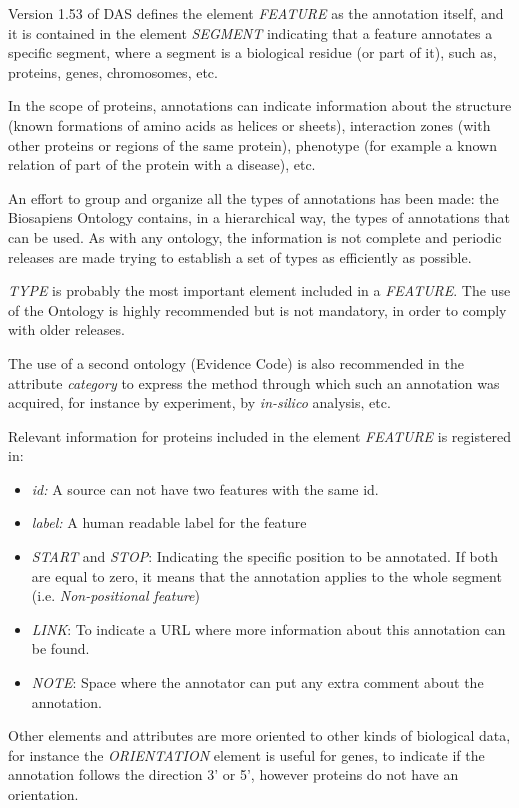 Version 1.53 of DAS defines the element \emph{FEATURE} as the annotation itself, and it is contained in the element \emph{SEGMENT} indicating that a feature annotates a specific segment, where a segment is a biological residue (or part of it), such as, proteins, genes, chromosomes, etc.

In the scope of proteins, annotations can indicate information about the structure (known formations of amino acids as helices or sheets), interaction zones (with other proteins or regions of the same protein), phenotype (for example a known relation of part of the protein with a disease), etc. 

An effort to group and organize all the types of annotations has been made: the Biosapiens Ontology contains, in a hierarchical way, the types of annotations that can be used. As with any ontology, the information is not complete and periodic releases are made trying to establish a set of types as efficiently as possible. 

\emph{TYPE} is probably the most important element included in a \emph{FEATURE}. The use of the Ontology is highly recommended but is not mandatory, in order to comply with older releases. 

The use of a second ontology (Evidence Code) is also recommended in the attribute \emph{category} to express the method through which such an annotation was acquired, for instance by experiment, by \emph{in-silico} analysis, etc.

Relevant information for proteins included in the element \emph{FEATURE} is registered in:

\begin{itemize}
 \item \emph{id:} A source can not have two features with the same id.
 \item \emph{label:} A human readable label for the feature
 \item \emph{START} and \emph{STOP}: Indicating the specific position to be annotated. If both are equal to zero, it means that the annotation applies to the whole segment (i.e. \emph{Non-positional feature})
 \item \emph{LINK}: To indicate a URL where more information about this annotation can be found.
 \item \emph{NOTE}: Space where the annotator can put any extra comment about the annotation.
\end{itemize}

Other elements and attributes are more oriented to other kinds of biological data, for instance the \emph{ORIENTATION} element is useful for genes, to indicate if the annotation follows the direction 3' or 5', however proteins do not have an orientation.

